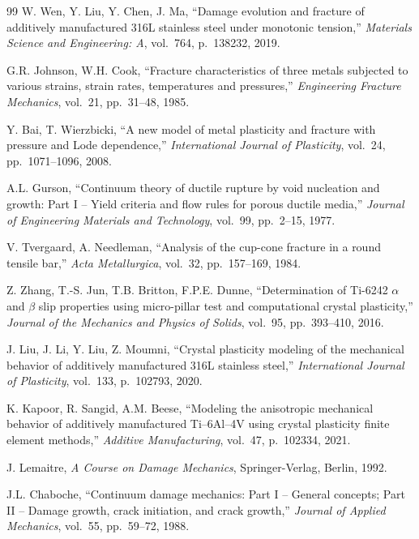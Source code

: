 \documentclass[12pt,a4paper,twocolumn]{article}
\begin{document}
\begin{thebibliography}{99}
W. Wen, Y. Liu, Y. Chen, J. Ma, ``Damage evolution and fracture of additively manufactured 316L stainless steel under monotonic tension,'' \textit{Materials Science and Engineering: A}, vol.~764, p.~138232, 2019.

G.R. Johnson, W.H. Cook, ``Fracture characteristics of three metals subjected to various strains, strain rates, temperatures and pressures,'' \textit{Engineering Fracture Mechanics}, vol.~21, pp.~31--48, 1985.

Y. Bai, T. Wierzbicki, ``A new model of metal plasticity and fracture with pressure and Lode dependence,'' \textit{International Journal of Plasticity}, vol.~24, pp.~1071--1096, 2008.

A.L. Gurson, ``Continuum theory of ductile rupture by void nucleation and growth: Part I -- Yield criteria and flow rules for porous ductile media,'' \textit{Journal of Engineering Materials and Technology}, vol.~99, pp.~2--15, 1977.

V. Tvergaard, A. Needleman, ``Analysis of the cup-cone fracture in a round tensile bar,'' \textit{Acta Metallurgica}, vol.~32, pp.~157--169, 1984.

Z. Zhang, T.-S. Jun, T.B. Britton, F.P.E. Dunne, ``Determination of Ti-6242 $\alpha$ and $\beta$ slip properties using micro-pillar test and computational crystal plasticity,'' \textit{Journal of the Mechanics and Physics of Solids}, vol.~95, pp.~393--410, 2016.

J. Liu, J. Li, Y. Liu, Z. Moumni, ``Crystal plasticity modeling of the mechanical behavior of additively manufactured 316L stainless steel,'' \textit{International Journal of Plasticity}, vol.~133, p.~102793, 2020.

K. Kapoor, R. Sangid, A.M. Beese, ``Modeling the anisotropic mechanical behavior of additively manufactured Ti--6Al--4V using crystal plasticity finite element methods,'' \textit{Additive Manufacturing}, vol.~47, p.~102334, 2021.

J. Lemaitre, \textit{A Course on Damage Mechanics}, Springer-Verlag, Berlin, 1992.

J.L. Chaboche, ``Continuum damage mechanics: Part I -- General concepts; Part II -- Damage growth, crack initiation, and crack growth,'' \textit{Journal of Applied Mechanics}, vol.~55, pp.~59--72, 1988.


\end{thebibliography}
\end{document}
